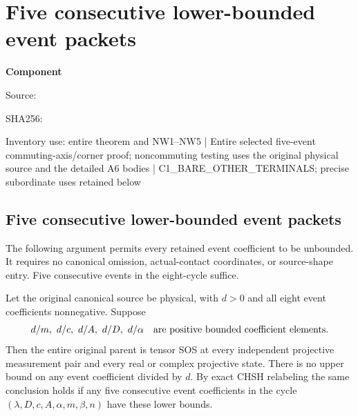 \chapter{Five consecutive lower-bounded event packets}
\label{component:p80253fe9bc1b}
\noindent\textbf{Component }\par
{\small\noindent Source: \par}
{\small\noindent SHA256: \par}
{\small\noindent Inventory use: entire theorem and NW1--NW5 | Entire selected five-event commuting-axis/corner proof; noncommuting testing uses the original physical source and the detailed A6 bodies | C1\_\allowbreak{}BARE\_\allowbreak{}OTHER\_\allowbreak{}TERMINALS; precise subordinate uses retained below\par}
\medskip
\section[Five consecutive lower-bounded event packets]{Five consecutive lower-bounded event packets}
\label{p80253fe9bc1b:sec:five-retained-events}

The following argument permits every retained event coefficient to be
unbounded. It requires no canonical omission, actual-contact coordinates,
or source-shape entry. Five consecutive events in the eight-cycle suffice.

\begin{theorem}
\label{p80253fe9bc1b:thm:five-retained-events}
Let the original canonical source be physical, with $d>0$ and all eight
event coefficients nonnegative. Suppose
\[
 d/m,\ d/c,\ d/A,\ d/D,\ d/\alpha
 \quad\hbox{are positive bounded coefficient elements}.
\]
Then the entire original parent is tensor SOS at every independent
projective measurement pair and every real or complex projective state.
There is no upper bound on any event coefficient divided by $d$.
By exact CHSH relabeling the same conclusion holds if any five
consecutive event coefficients in the cycle
$(\lambda,D,c,A,\alpha,m,\beta,n)$ have these lower bounds.
\end{theorem}

